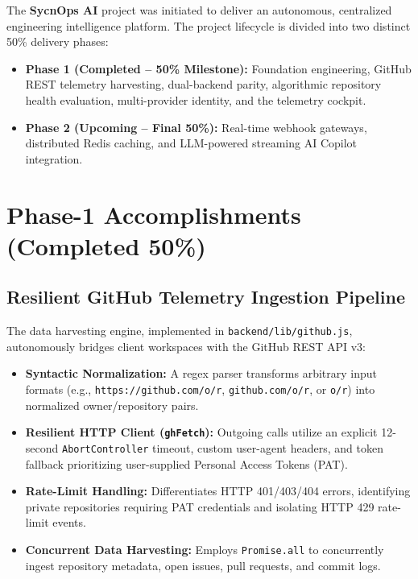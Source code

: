 \documentclass[conference]{IEEEtran}
\begin{document}
The \textbf{SycnOps AI} project was initiated to deliver an autonomous, centralized engineering intelligence platform. The project lifecycle is divided into two distinct 50\% delivery phases:
\begin{itemize}
    \item \textbf{Phase 1 (Completed -- 50\% Milestone):} Foundation engineering, GitHub REST telemetry harvesting, dual-backend parity, algorithmic repository health evaluation, multi-provider identity, and the telemetry cockpit.
    \item \textbf{Phase 2 (Upcoming -- Final 50\%):} Real-time webhook gateways, distributed Redis caching, and LLM-powered streaming AI Copilot integration.
\end{itemize}

\section{Phase-1 Accomplishments (Completed 50\%)}

\subsection{Resilient GitHub Telemetry Ingestion Pipeline}
The data harvesting engine, implemented in \texttt{backend/lib/github.js}, autonomously bridges client workspaces with the GitHub REST API v3:
\begin{itemize}
    \item \textbf{Syntactic Normalization:} A regex parser transforms arbitrary input formats (e.g., \texttt{https://github.com/o/r}, \texttt{github.com/o/r}, or \texttt{o/r}) into normalized owner/repository pairs.
    \item \textbf{Resilient HTTP Client (\texttt{ghFetch}):} Outgoing calls utilize an explicit 12-second \texttt{AbortController} timeout, custom user-agent headers, and token fallback prioritizing user-supplied Personal Access Tokens (PAT).
    \item \textbf{Rate-Limit Handling:} Differentiates HTTP 401/403/404 errors, identifying private repositories requiring PAT credentials and isolating HTTP 429 rate-limit events.
    \item \textbf{Concurrent Data Harvesting:} Employs \texttt{Promise.all} to concurrently ingest repository metadata, open issues, pull requests, and commit logs.
\end{itemize}
\end{document}
